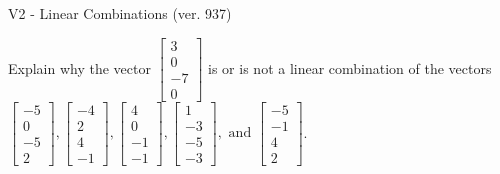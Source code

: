 \begin{exercise}
  \begin{exerciseTitle}V2 - Linear Combinations (ver. 937)\end{exerciseTitle}
  \begin{exerciseStatement}
    Explain why the vector \(\left[\begin{array}{c}
3 \\
0 \\
-7 \\
0
\end{array}\right]\)  is or is not a linear 
	combination of the vectors \(\left[\begin{array}{c}
-5 \\
0 \\
-5 \\
2
\end{array}\right] , \left[\begin{array}{c}
-4 \\
2 \\
4 \\
-1
\end{array}\right] , \left[\begin{array}{c}
4 \\
0 \\
-1 \\
-1
\end{array}\right] , \left[\begin{array}{c}
1 \\
-3 \\
-5 \\
-3
\end{array}\right] , \text{ and } \left[\begin{array}{c}
-5 \\
-1 \\
4 \\
2
\end{array}\right]\).
	



\end{exerciseStatement}
\end{exercise}
